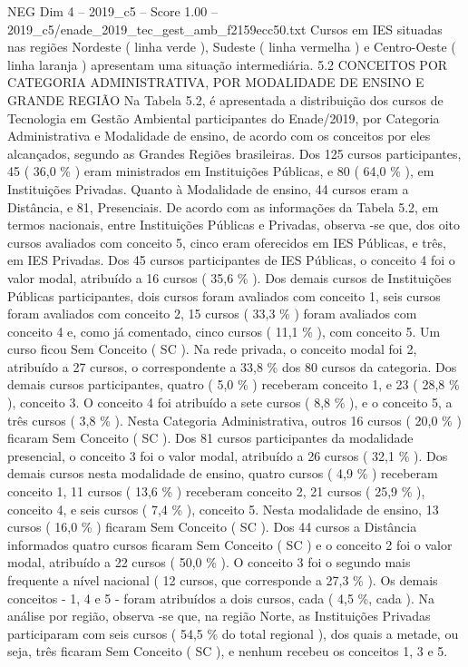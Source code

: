 \begin{textsample}{NEG Dim 4 – 2019\_c5 – Score 1.00 – 2019\_c5/enade\_2019\_tec\_gest\_amb\_f2159ecc50.txt}
Cursos em IES situadas nas regiões Nordeste ( linha verde ), Sudeste ( linha vermelha ) e Centro-Oeste ( linha laranja ) apresentam uma situação intermediária. 5.2 CONCEITOS POR CATEGORIA ADMINISTRATIVA, POR MODALIDADE DE ENSINO E GRANDE REGIÃO Na Tabela 5.2, é apresentada a distribuição dos cursos de Tecnologia em Gestão Ambiental participantes do Enade/2019, por Categoria Administrativa e Modalidade de ensino, de acordo com os conceitos por eles alcançados, segundo as Grandes Regiões brasileiras.
Dos 125 cursos participantes, 45 ( 36,0 \% ) eram ministrados em Instituições Públicas, e 80 ( 64,0 \% ), em Instituições Privadas.
Quanto à Modalidade de ensino, 44 cursos eram a Distância, e 81, Presenciais.
De acordo com as informações da Tabela 5.2, em termos nacionais, entre Instituições Públicas e Privadas, observa -se que, dos oito cursos avaliados com conceito 5, cinco eram oferecidos em IES Públicas, e três, em IES Privadas.
Dos 45 cursos participantes de IES Públicas, o conceito 4 foi o valor modal, atribuído a 16 cursos ( 35,6 \% ).
Dos demais cursos de Instituições Públicas participantes, dois cursos foram avaliados com conceito 1, seis cursos foram avaliados com conceito 2, 15 cursos ( 33,3 \% ) foram avaliados com conceito 4 e, como já comentado, cinco cursos ( 11,1 \% ), com conceito 5.
Um curso ficou Sem Conceito ( SC ).
Na rede privada, o conceito modal foi 2, atribuído a 27 cursos, o correspondente a 33,8 \% dos 80 cursos da categoria.
Dos demais cursos participantes, quatro ( 5,0 \% ) receberam conceito 1, e 23 ( 28,8 \% ), conceito 3.
O conceito 4 foi atribuído a sete cursos ( 8,8 \% ), e o conceito 5, a três cursos ( 3,8 \% ).
Nesta Categoria Administrativa, outros 16 cursos ( 20,0 \% ) ficaram Sem Conceito ( SC ).
Dos 81 cursos participantes da modalidade presencial, o conceito 3 foi o valor modal, atribuído a 26 cursos ( 32,1 \% ).
Dos demais cursos nesta modalidade de ensino, quatro cursos ( 4,9 \% ) receberam conceito 1, 11 cursos ( 13,6 \% ) receberam conceito 2, 21 cursos ( 25,9 \% ), conceito 4, e seis cursos ( 7,4 \% ), conceito 5.
Nesta modalidade de ensino, 13 cursos ( 16,0 \% ) ficaram Sem Conceito ( SC ).
Dos 44 cursos a Distância informados quatro cursos ficaram Sem Conceito ( SC ) e o conceito 2 foi o valor modal, atribuído a 22 cursos ( 50,0 \% ).
O conceito 3 foi o segundo mais frequente a nível nacional ( 12 cursos, que corresponde a 27,3 \% ).
Os demais conceitos - 1, 4 e 5 - foram atribuídos a dois cursos, cada ( 4,5 \%, cada ).
Na análise por região, observa -se que, na região Norte, as Instituições Privadas participaram com seis cursos ( 54,5 \% do total regional ), dos quais a metade, ou seja, três ficaram Sem Conceito ( SC ), e nenhum recebeu os conceitos 1, 3 e 5.

\end{textsample}
